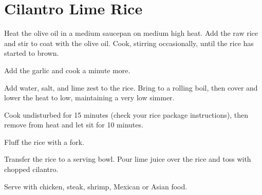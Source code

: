 \section{Cilantro Lime Rice}
\begin{recipe}




Heat the olive oil in a medium saucepan on medium high heat. Add the raw rice and stir to coat with the olive oil. Cook, stirring occasionally, until the rice has started to brown.

Add the garlic and cook a minute more.

Add water, salt, and lime zest to the rice. Bring to a rolling boil, then cover and lower the heat to low, maintaining a very low simmer.

Cook undisturbed for 15 minutes (check your rice package instructions), then remove from heat and let sit for 10 minutes.

Fluff the rice with a fork.

Transfer the rice to a serving bowl. Pour lime juice over the rice and toss with chopped cilantro.

Serve with chicken, steak, shrimp, Mexican or Asian food.



\end{recipe}
